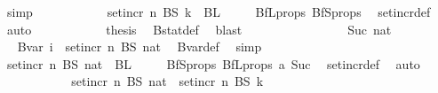 \begin{isabellebody}
\ simp\isanewline
\ \ \ \ \ \ \ \ \isamarkupfalse%
\ \isamarkupfalse%
\ {\isachardoublequoteopen}set{\isacharunderscore}{\kern0pt}incr\ n\ {\isacharparenleft}{\kern0pt}BS\ k{\isacharparenright}{\kern0pt}\ {\isasyminter}\ BL\ {}\ {\isacharequal}{\kern0pt}\ {\isacharbraceleft}{\kern0pt}{\isacharbraceright}{\kern0pt}{\isachardoublequoteclose}\ \isamarkupfalse%
\ BfL{\isacharunderscore}{\kern0pt}props\ BfS{\isacharunderscore}{\kern0pt}props\ \isamarkupfalse%
\ set{\isacharunderscore}{\kern0pt}incr{\isacharunderscore}{\kern0pt}def\ \isamarkupfalse%
\ auto\isanewline
\ \ \ \ \ \ \ \ \isamarkupfalse%
\ \isamarkupfalse%
\ {\isacharquery}{\kern0pt}thesis\ \isamarkupfalse%
\ Bstat{\isacharunderscore}{\kern0pt}def\ \isamarkupfalse%
\ blast\isanewline
\ \ \ \ \ \ \isamarkupfalse%
\isanewline
\ \ \ \ \ \ \ \ \isamarkupfalse%
\ {\isacharparenleft}{\kern0pt}Suc\ nat{\isacharparenright}{\kern0pt}\isanewline
\ \ \ \ \ \ \ \ \isamarkupfalse%
\ \isamarkupfalse%
\ {\isachardoublequoteopen}Bvar\ i\ {\isacharequal}{\kern0pt}\ set{\isacharunderscore}{\kern0pt}incr\ n\ {\isacharparenleft}{\kern0pt}BS\ nat{\isacharparenright}{\kern0pt}{\isachardoublequoteclose}\ \isamarkupfalse%
\ Bvar{\isacharunderscore}{\kern0pt}def\ \isamarkupfalse%
\ simp\isanewline
\ \ \ \ \ \ \ \ \isamarkupfalse%
\ \isamarkupfalse%
\ {\isachardoublequoteopen}set{\isacharunderscore}{\kern0pt}incr\ n\ {\isacharparenleft}{\kern0pt}BS\ nat{\isacharparenright}{\kern0pt}\ {\isasyminter}\ BL\ {}\ {\isacharequal}{\kern0pt}\ {\isacharbraceleft}{\kern0pt}{\isacharbraceright}{\kern0pt}{\isachardoublequoteclose}\ \isamarkupfalse%
\ BfS{\isacharunderscore}{\kern0pt}props\ BfL{\isacharunderscore}{\kern0pt}props\ a\ Suc\ \isamarkupfalse%
\ set{\isacharunderscore}{\kern0pt}incr{\isacharunderscore}{\kern0pt}def\ \isamarkupfalse%
\ auto\isanewline
\ \ \ \ \ \ \ \ \isamarkupfalse%
\ \isamarkupfalse%
\ {\isachardoublequoteopen}set{\isacharunderscore}{\kern0pt}incr\ n\ {\isacharparenleft}{\kern0pt}BS\ nat{\isacharparenright}{\kern0pt}\ {\isasyminter}\ set{\isacharunderscore}{\kern0pt}incr\ n\ {\isacharparenleft}{\kern0pt}BS\ k{\isacharparenright}{\kern0pt}\ {\isacharequal}{\kern0pt}\ {\isacharbraceleft}{\kern0pt}{\isacharbraceright}{\kern0pt}{\isachardoublequoteclose}\ \isamarkupfalse%

\end{isabellebody}
